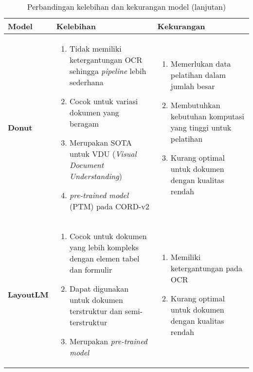 \begin{table}[h!]
\ContinuedFloat %
\caption{Perbandingan kelebihan dan kekurangan model (lanjutan)}
\begin{tabularx}{\linewidth}{|p{2cm}|X|X|}
\hline
\textbf{Model} & \textbf{Kelebihan} & \textbf{Kekurangan} \\
\hline
\textbf{Donut} &
\begin{enumerate}
    \item Tidak memiliki ketergantungan OCR sehingga \emph{pipeline} lebih sederhana
    \item Cocok untuk variasi dokumen yang beragam
    \item Merupakan SOTA untuk VDU (\textit{Visual Document Understanding})
    \item \textit{pre-trained model} (PTM) pada \dataset{} CORD-v2
\end{enumerate}
&
\begin{enumerate}
    \item Memerlukan data pelatihan dalam jumlah besar
    \item Membutuhkan kebutuhan komputasi yang tinggi untuk pelatihan
    \item Kurang optimal untuk dokumen dengan kualitas rendah
\end{enumerate}
\\ \hline
\textbf{LayoutLM} &
\begin{enumerate}
    \item Cocok untuk dokumen yang lebih kompleks dengan elemen tabel dan formulir
    \item Dapat digunakan untuk dokumen terstruktur dan semi-terstruktur
    \item Merupakan \textit{pre-trained model}
\end{enumerate}
&
\begin{enumerate}
    \item Memiliki ketergantungan pada OCR
    \item Kurang optimal untuk dokumen dengan kualitas rendah
\end{enumerate}
\\ \hline


\end{tabularx}
\end{table}
